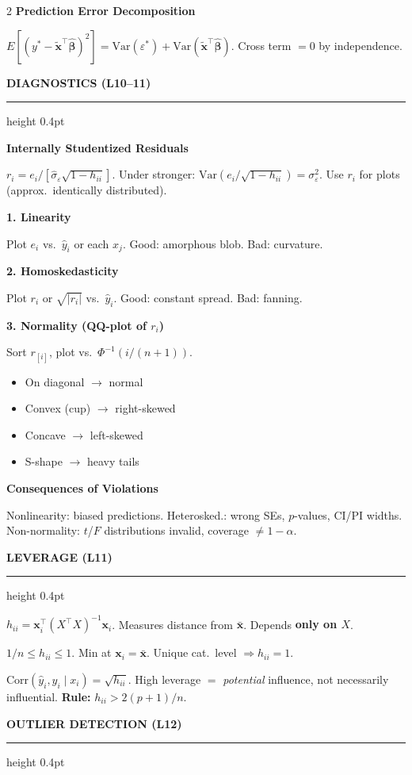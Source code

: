 \documentclass[7pt]{extarticle}
\newcommand{\msection}[1]{%
  \vspace{4pt}%
  {\small\bfseries\color{blue!70!black}\MakeUppercase{#1}}%
  \vspace{1pt}%
  \par\nobreak%
  {\color{blue!70!black}\hrule height 0.4pt}%
  \vspace{2pt}\par\nobreak%
}
\newcommand{\msubsection}[1]{%
  \vspace{2pt}%
  {\footnotesize\bfseries\color{purple!70!black}#1}%
  \vspace{1pt}\par\nobreak%
}
\newcommand{\bhat}{\hat{\bm{\beta}}}
\newcommand{\xt}{\tilde{\bm{x}}}
\newcommand{\sighat}{\hat{\sigma}_\varepsilon}
\newcommand{\sigeps}{\sigma_\varepsilon}
\newcommand{\XtX}{X^\top X}
\newcommand{\ep}{\varepsilon}
\begin{document}
\begin{multicols*}{2}
\msubsection{Prediction Error Decomposition}
$E[(y^*{-}\xt^\top\bhat)^2] = \text{Var}(\ep^*) + \text{Var}(\xt^\top\bhat)$. Cross term $= 0$ by independence.

\msection{Diagnostics (L10--11)}

\msubsection{Internally Studentized Residuals}
$r_i = e_i/[\sighat\sqrt{1-h_{ii}}]$. \; Under stronger: $\text{Var}(e_i/\sqrt{1{-}h_{ii}}) = \sigeps^2$. Use $r_i$ for plots (approx.\ identically distributed).

\msubsection{1. Linearity}
Plot $e_i$ vs.\ $\hat{y}_i$ or each $x_j$. Good: amorphous blob. Bad: curvature.

\msubsection{2. Homoskedasticity}
Plot $r_i$ or $\sqrt{|r_i|}$ vs.\ $\hat{y}_i$. Good: constant spread. Bad: fanning.

\msubsection{3. Normality (QQ-plot of $r_i$)}
Sort $r_{[i]}$, plot vs.\ $\Phi^{-1}\!(i/(n{+}1))$.

\begin{itemize}
\item On diagonal $\to$ normal
\item Convex (cup) $\to$ right-skewed
\item Concave $\to$ left-skewed
\item S-shape $\to$ heavy tails
\end{itemize}

\msubsection{Consequences of Violations}
Nonlinearity: biased predictions. Heterosked.: wrong SEs, $p$-values, CI/PI widths. Non-normality: $t$/$F$ distributions invalid, coverage $\ne 1{-}\alpha$.

\msection{Leverage (L11)}

$h_{ii} = \bm{x}_i^\top(\XtX)^{-1}\bm{x}_i$. Measures distance from $\bar{\bm{x}}$. Depends \textbf{only on $X$}.

$1/n \le h_{ii} \le 1$. Min at $\bm{x}_i = \bar{\bm{x}}$. Unique cat.\ level $\Rightarrow h_{ii}=1$.

$\text{Corr}(\hat{y}_i, y_i \mid x_i) = \sqrt{h_{ii}}$. High leverage $=$ \emph{potential} influence, not necessarily influential. \textbf{Rule:} $h_{ii} > 2(p{+}1)/n$.

\msection{Outlier Detection (L12)}


\end{multicols*}
\end{document}
